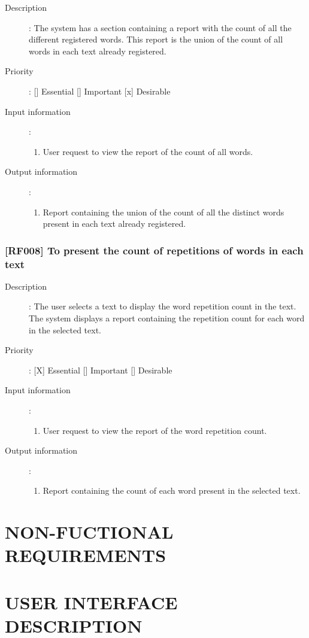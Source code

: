 \documentclass[11pt, twoside, a4paper]{book}
\begin{document}
				\begin{description}
					
					\item[Description]: The system has a section containing a report with the count of all the different registered words. This report is the union of the count of all words in each text already registered.
					\item[Priority]: [] Essential [] Important [x] Desirable
					\item[Input information]:
						\begin{enumerate}

							\item User request to view the report of the count of all words.
							
						\end{enumerate}
					\item[Output information]:
						\begin{enumerate}

							\item Report containing the union of the count of all the distinct words present in each text already registered.
																					
						\end{enumerate}
	
				\end{description}
		
			\subsection{[RF008] To present the count of repetitions of words in each text}
				
				\begin{description}

					\item[Description]: The user selects a text to display the word repetition count in the text. The system displays a report containing the repetition count for each word in the selected text.
					\item[Priority]: [X] Essential [] Important [] Desirable
					\item[Input information]:
						\begin{enumerate}

							\item User request to view the report of the word repetition count.
							
						\end{enumerate}
					\item[Output information]:
						\begin{enumerate}

							\item Report containing the count of each word present in the selected text.
																					
						\end{enumerate}
	
				\end{description}	
				
	\chapter{NON-FUCTIONAL REQUIREMENTS}
	
	\chapter{USER INTERFACE DESCRIPTION}
\end{document}
